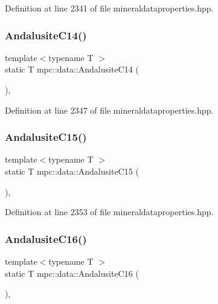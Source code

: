 Definition at line 2341 of file mineraldataproperties.\+hpp.

\mbox{\label{namespacempc_1_1data_a19cba9d985946439c17d416f29df5965}} 
\subsubsection{\texorpdfstring{Andalusite\+C14()}{AndalusiteC14()}}
{\footnotesize\ttfamily template$<$typename T $>$ \\
static T mpc\+::data\+::\+Andalusite\+C14 (\begin{DoxyParamCaption}{ }\end{DoxyParamCaption})\hspace{0.3cm}{\ttfamily [inline]}, {\ttfamily [static]}}



Definition at line 2347 of file mineraldataproperties.\+hpp.

\mbox{\label{namespacempc_1_1data_ad1b0bd6dc40b2cc4d1dc4e1541da7506}} 
\subsubsection{\texorpdfstring{Andalusite\+C15()}{AndalusiteC15()}}
{\footnotesize\ttfamily template$<$typename T $>$ \\
static T mpc\+::data\+::\+Andalusite\+C15 (\begin{DoxyParamCaption}{ }\end{DoxyParamCaption})\hspace{0.3cm}{\ttfamily [inline]}, {\ttfamily [static]}}



Definition at line 2353 of file mineraldataproperties.\+hpp.

\mbox{\label{namespacempc_1_1data_ab1460702194a57dabba786817e99d480}} 
\subsubsection{\texorpdfstring{Andalusite\+C16()}{AndalusiteC16()}}
{\footnotesize\ttfamily template$<$typename T $>$ \\
static T mpc\+::data\+::\+Andalusite\+C16 (\begin{DoxyParamCaption}{ }\end{DoxyParamCaption})\hspace{0.3cm}{\ttfamily [inline]}, {\ttfamily [static]}}



